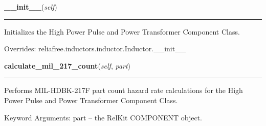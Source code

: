 \hspace{.8\funcindent}\begin{boxedminipage}{\funcwidth}

    \raggedright \textbf{\_\_init\_\_}(\textit{self})

    \vspace{-1.5ex}

    \rule{\textwidth}{0.5\fboxrule}
\setlength{\parskip}{2ex}
    Initializes the High Power Pulse and Power Transformer Component Class.

\setlength{\parskip}{1ex}
      Overrides: reliafree.inductors.inductor.Inductor.\_\_init\_\_

    \end{boxedminipage}

    \label{reliafree:inductors:transformer:Power:calculate_mil_217_count}

    \vspace{0.5ex}

\hspace{.8\funcindent}\begin{boxedminipage}{\funcwidth}

    \raggedright \textbf{calculate\_mil\_217\_count}(\textit{self}, \textit{part})

    \vspace{-1.5ex}

    \rule{\textwidth}{0.5\fboxrule}
\setlength{\parskip}{2ex}
    Performs MIL-HDBK-217F part count hazard rate calculations for the High
    Power Pulse and Power Transformer Component Class.

    Keyword Arguments: part -- the RelKit COMPONENT object.

\setlength{\parskip}{1ex}
    \end{boxedminipage}

    \label{reliafree:inductors:transformer:Power:calculate_mil_217_stress}

    \vspace{0.5ex}

